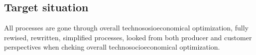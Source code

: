 \subsection{Target situation}
\label{target_situation}

All processes are gone through overall technososioeconomical optimization,
fully rewised, rewritten, simplified processes,
looked from both producer and customer perspectives when cheking overall technosocioeconomical optimization.

